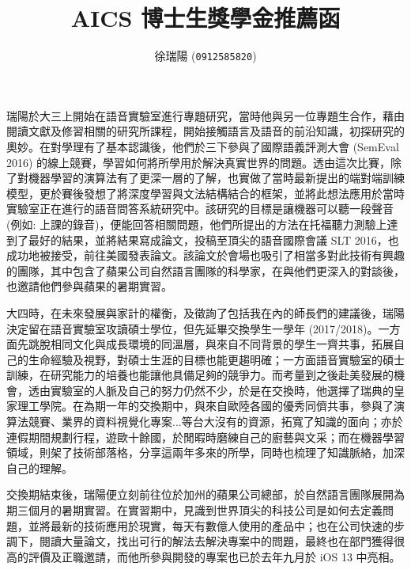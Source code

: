 \documentclass[12pt,UTF8,fntef]{article}
\title{AICS 博士生獎學金推薦函}
\author{徐瑞陽 (\texttt{0912585820})}
\date{}
\begin{document}
\maketitle

  瑞陽於大三上開始在語音實驗室進行專題研究，當時他與另一位專題生合作，藉由閱讀文獻及修習相關的研究所課程，開始接觸語言及語音的前沿知識，初探研究的奧妙。在對學理有了基本認識後，他們於三下參與了國際語義評測大會 (SemEval 2016) 的線上競賽，學習如何將所學用於解決真實世界的問題。透由這次比賽，除了對機器學習的演算法有了更深一層的了解，也實做了當時最新提出的端對端訓練模型，更於賽後發想了將深度學習與文法結構結合的框架，並將此想法應用於當時實驗室正在進行的語音問答系統研究中。該研究的目標是讓機器可以聽一段聲音 (例如: 上課的錄音)，便能回答相關問題，他們所提出的方法在托福聽力測驗上達到了最好的結果，並將結果寫成論文，投稿至頂尖的語音國際會議 SLT 2016，也成功地被接受，前往美國發表論文。該論文於會場也吸引了相當多對此技術有興趣的團隊，其中包含了蘋果公司自然語言團隊的科學家，在與他們更深入的對談後，也邀請他們參與蘋果的暑期實習。

\vspace{1.5em}

大四時，在未來發展與家計的權衡，及徵詢了包括我在內的師長們的建議後，瑞陽決定留在語音實驗室攻讀碩士學位，但先延畢交換學生一學年 (2017/2018)。一方面先跳脫相同文化與成長環境的同溫層，與來自不同背景的學生一齊共事，拓展自己的生命經驗及視野，對碩士生涯的目標也能更趨明確；一方面語音實驗室的碩士訓練，在研究能力的培養也能讓他具備足夠的競爭力。而考量到之後赴美發展的機會，透由實驗室的人脈及自己的努力仍然不少，於是在交換時，他選擇了瑞典的皇家理工學院。在為期一年的交換期中，與來自歐陸各國的優秀同儕共事，參與了演算法競賽、業界的資料視覺化專案...等台大沒有的資源，拓寬了知識的面向；亦於連假期間規劃行程，遊歐十餘國，於閒暇時磨練自己的廚藝與文采；而在機器學習領域，則架了技術部落格，分享這兩年多來的所學，同時也梳理了知識脈絡，加深自己的理解。

\vspace{1.5em}

交換期結束後，瑞陽便立刻前往位於加州的蘋果公司總部，於自然語言團隊展開為期三個月的暑期實習。在實習期中，見識到世界頂尖的科技公司是如何去定義問題，並將最新的技術應用於現實，每天有數億人使用的產品中；也在公司快速的步調下，閱讀大量論文，找出可行的解法去解決專案中的問題，最終也在部門獲得很高的評價及正職邀請，而他所參與開發的專案也已於去年九月於 iOS 13 中亮相。

\vspace{1.5em}
\end{document}
